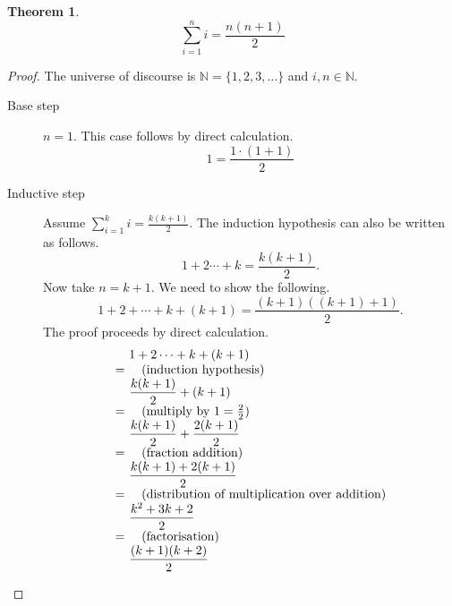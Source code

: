 \documentclass[a4paper,11pt]{article}
\makeatletter
\theoremstyle{plain}
\newtheorem{theorem}{Theorem}[section]
\theoremstyle{definition}
\newcommand{\ba}{\begin{array}}
\newcommand{\ea}{\end{array}}
\newenvironment{derivation}{\begin{displaymath}\ba{@{}r@{~}l@{}}}{\ea\end{displaymath}\ignorespacesafterend}
\newcommand{\reason}[1]{\quad (\text{#1})}
\makeatother
\begin{document}
\begin{theorem}
  \[
    \displaystyle\sum_{i=1}^ni = \frac{n(n+1)}{2}
  \]
\end{theorem}
%
\begin{proof}
  The universe of discourse is $\mathbb{N} = \{1,2,3,\dots\}$ and $i,n\in\mathbb{N}$.
  \begin{description}
  \item[Base step] $n = 1$. This case follows by direct calculation.
    \[
      1 = \frac{1\cdot(1+1)}{2}
    \]
  \item[Inductive step] Assume $\sum_{i=1}^ki = \frac{k(k+1)}{2}$.
    The induction hypothesis can also be written as follows.
    \[
      1+2\cdots+k = \frac{k(k+1)}{2}.
    \]
    Now take $n = k + 1$. We need to show the following.
    \[
      1+2+\cdots+k+(k+1) = \frac{(k+1)((k+1)+1)}{2}.
    \]
    The proof proceeds by direct calculation.
    \begin{derivation}
      &1+2\cdots+k+(k+1)\\
     =& \reason{induction hypothesis}\\
      &\displaystyle\frac{k(k+1)}{2} + (k+1)\\
     =& \reason{multiply by $1 = \frac{2}{2}$}\\
      & \displaystyle\frac{k(k+1)}{2} + \frac{2(k+1)}{2}\\
     =& \reason{fraction addition}\\
      & \displaystyle\frac{k(k+1)+2(k+1)}{2}\\
     =& \reason{distribution of multiplication over addition}\\
      &\displaystyle\frac{k^2+3k+2}{2}\\
     =&\reason{factorisation}\\
      &\displaystyle\frac{(k+1)(k+2)}{2} \\
    \end{derivation}
  \end{description}
\end{proof}
\end{document}
